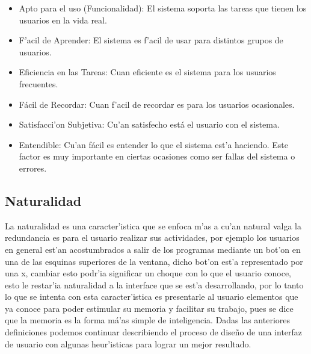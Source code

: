 \begin{itemize}
	\item Apto para el uso (Funcionalidad): El sistema soporta las tareas que tienen los usuarios en la vida real.
	
	\item F'acil de Aprender: El sistema es f'acil de usar para distintos grupos de usuarios.

	\item Eficiencia en las Tareas: Cuan eficiente es el sistema para los usuarios frecuentes.

	\item Fácil de Recordar: Cuan f'acil de recordar es para los usuarios ocasionales.

	\item Satisfacci'on Subjetiva: Cu'an satisfecho está el usuario con el sistema.
	
	\item Entendible: Cu'an fácil es entender lo que el sistema est'a haciendo. Este factor es muy importante en ciertas ocasiones como ser fallas del sistema o errores.
\end{itemize}

\medskip

\subsection{Naturalidad}
La naturalidad es una caracter'istica que se enfoca m'as a cu'an natural valga la redundancia es para el usuario realizar sus actividades, por ejemplo los usuarios en general est'an acostumbrados a salir de los programas mediante un bot'on en una de las esquinas superiores de la ventana, dicho bot'on est'a representado por una x, cambiar esto podr'ia significar un choque con lo que el usuario conoce, esto le restar'ia naturalidad a la interface que se est'a desarrollando, por lo tanto lo que se intenta con esta caracter'istica es presentarle al usuario elementos que ya conoce para poder estimular su memoria y facilitar su trabajo, pues se dice que la memoria es la forma má'as simple de inteligencia.
Dadas las anteriores definiciones podemos continuar describiendo el proceso de dise\~no de una interfaz de usuario con algunas heur'isticas para lograr un mejor resultado.

